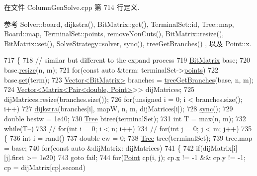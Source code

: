 在文件 Column\+Gen\+Solve.\+cpp 第 714 行定义.



参考 Solver\+::board, dijkstra(), Bit\+Matrix\+::get(), Terminal\+Set\+::id, Tree\+::map, Board\+::map, Terminal\+Set\+::points, remove\+Non\+Cuts(), Bit\+Matrix\+::resize(), Bit\+Matrix\+::set(), Solve\+Strategy\+::solver, sync(), tree\+Get\+Branches() , 以及 Point\+::x.


\begin{DoxyCode}
717 \{
718     \textcolor{comment}{// similar but different to the expand process}
719     \hyperlink{classBitMatrix}{BitMatrix} base;
720     base.\hyperlink{classBitMatrix_ab09face4935598cf90705d6e8f8d1cfa}{resize}(n, m);
721     \textcolor{keywordflow}{for}(\textcolor{keyword}{const} \textcolor{keyword}{auto} &term: terminalSet->\hyperlink{classTerminalSet_a08ca403fedfeab1fed1dbf96cf7ec1cb}{points})
722         base.\hyperlink{classBitMatrix_ad26dd2e93e9d24d70834d6d79e29c81e}{set}(term);
723     \hyperlink{classVector}{Vector<BitMatrix>} branches = \hyperlink{classColumnGenSolve_acbcc78e94e4a6e59ceb7da2357ddb87a}{treeGetBranches}(base, n, m);
724     \hyperlink{classVector}{Vector<Matrix<Pair<double, Point>}>> dijMatrices;
725     dijMatrices.resize(branches.size());
726     \textcolor{keywordflow}{for}(\textcolor{keywordtype}{unsigned} i = 0; i < branches.size(); i++)
727         \hyperlink{classColumnGenSolve_a71007959556061091171c03da6197f34}{dijkstra}(branches[i], mapW, n, m, dijMatrices[i]);
728     \hyperlink{classColumnGenSolve_ab976cab8582808218110d86252177f88}{sync}();
729     \textcolor{keywordtype}{double} bestw = 1e40;
730     \hyperlink{classTree}{Tree} btree(terminalSet);
731     \textcolor{keywordtype}{int} T = max(n, m);
732     \textcolor{keywordflow}{while}(T--)
733     \textcolor{comment}{// for(int i = 0; i < n; i++)}
734         \textcolor{comment}{// for(int j = 0; j < m; j++)}
735         \{
736             \textcolor{keywordtype}{int} i = rand() %
737             \textcolor{keywordtype}{double} cw = 0;
738             \hyperlink{classTree}{Tree} tree(terminalSet);
739             tree.map = base;
740             \textcolor{keywordflow}{for}(\textcolor{keyword}{const} \textcolor{keyword}{auto} &dijMatrix: dijMatrices)
741             \{
742                 \textcolor{keywordflow}{if}(dijMatrix[i][j].first >= 1e20)
743                     \textcolor{keywordflow}{goto} fail;
744                 \textcolor{keywordflow}{for}(\hyperlink{classPoint}{Point} cp(i, j); cp.\hyperlink{classPoint_a8c779e11e694b20e0946105a9f5de842}{x} != -1 && cp.y != -1; cp = dijMatrix[cp].second)

\end{DoxyCode}
